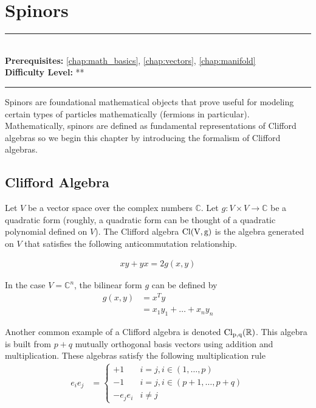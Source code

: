 \documentclass[book.tex]{subfiles}
\begin{document}
\chapter{Spinors}
\label{chap:hilbert}
\noindent\rule{11cm}{0.4pt} \\
\textbf{Prerequisites:} \autoref{chap:math_basics}, \autoref{chap:vectors}, \autoref{chap:manifold} \\
\textbf{Difficulty Level:} ** \\
\noindent\rule{11cm}{0.4pt}
\vspace{5mm}

Spinors are foundational mathematical objects that prove useful for modeling certain types of particles mathematically (fermions in particular). Mathematically, spinors are defined as fundamental representations of Clifford algebras so we begin this chapter by introducing the formalism of Clifford algebras.

\section{Clifford Algebra}

Let $V$ be a vector space over the complex numbers $\mathbb{C}$. Let $g: V \times V \to \mathbb{C}$ be a quadratic form (roughly, a quadratic form can be thought of a quadratic polynomial defined on $V$). The Clifford algebra $\rm{Cl}(V, g)$ is the algebra generated on $V$ that satisfies the following anticommutation relationship.

\begin{align}
    xy + yx = 2g(x, y)
\end{align}

In the case $V = \mathbb{C}^n$, the bilinear form $g$ can be defined by
\begin{align}
    g(x, y) &= x^T y \\
    &= x_1 y_1 + \dotsc + x_n y_n
\end{align}

Another common example of a Clifford algebra is denoted $\rm{Cl}_{p, q}(\mathbb{R})$. This algebra is built from $p+q$ mutually orthogonal basis vectors using addition and multiplication. These algebras satisfy the following multiplication rule
\begin{align}
    e_i e_j &= \begin{cases}
    +1 & i=j, i \in (1,\dotsc, p) \\
    -1 & i=j, i \in (p+1,\dotsc,p+q) \\
    -e_je_i & i \neq j
    \end{cases}
\end{align}
\end{document}
